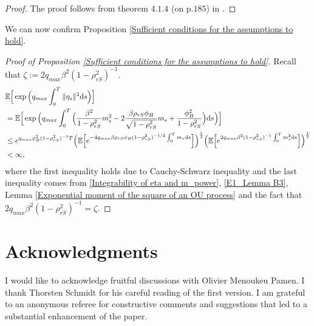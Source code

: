 \documentclass[12,reqno]{amsart}
\numberwithin{equation}{section}
\begin{document}
\begin{proof}
	The proof follows from theorem $4.1.4$ (on p.$185$) in \cite{abou2012matrix}.
\end{proof}
We can now confirm Proposition \ref{Sufficient conditions for the assumptions to hold}.
\begin{proof}[Proof of Proposition \ref{Sufficient conditions for the assumptions to hold}]
	Recall that $\zeta:=2q_{max}\beta^{2}(1-\rho_{rS}^{2})^{-1}$.
	\begin{align*}
		&\mathbb{E}\Big[\exp\Big(q_{max}\int_{0}^{T}\|\eta_{s}\|^{2}\mathrm{d}s\Big)\Big]\notag\\
		&=\mathbb{E}\Big[\exp\Big(q_{max}\int_{0}^{T}\Big(\frac{\beta^{2}}{1-\rho_{rS}^{2}}m_{s}^{2}-2\frac{\beta\rho_{rS}\phi_{B}}{\sqrt{1-\rho_{rS}^{2}}}m_{s}+\frac{\phi_{B}^{2}}{1-\rho_{rS}^{2}}\Big)\mathrm{d}s\Big)\Big]\notag\\
		&\le e^{q_{max}\phi_{B}^{2}(1-\rho_{rS}^{2})^{-1}T}\Big(\mathbb{E}\Big[e^{-4q_{max}\beta\rho_{rS}\phi_{B}(1-\rho_{rS}^{2})^{-1/2}\int_{0}^{T}m_{s}\mathrm{d}s}\Big]\Big)^{\frac{1}{2}}\Big(\mathbb{E}\Big[e^{2q_{max}\beta^{2}(1-\rho_{rS}^{2})^{-1}\int_{0}^{T}m_{s}^{2}\mathrm{d}s}\Big]\Big)^{\frac{1}{2}}\notag\\
		&<\infty,
	\end{align*}
	where the first inequality holds due to Cauchy-Schwarz inequality and the last inequality comes from \eqref{Integrability of eta and m_power}, \eqref{E1_Lemma B3}, Lemma \ref{Exponential moment of the square of an OU process} and the fact that $2q_{max}\beta^{2}(1-\rho_{rS}^{2})^{-1}=\zeta$.
\end{proof}


\section*{Acknowledgments}
I would like to acknowledge fruitful discussions with Olivier Menoukeu Pamen. I thank Thorsten Schmidt for his careful reading of the first version. I am grateful to an anonymous referee for constructive comments and suggestions that led to a substantial enhancement of the paper.




\end{document}
